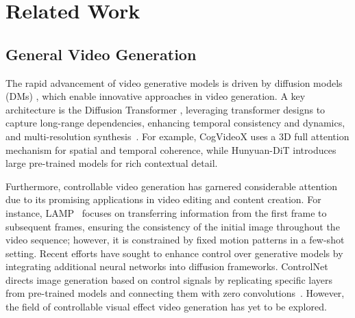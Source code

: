 \section{Related Work}
\subsection{General Video Generation}
The rapid advancement of video generative models is driven by diffusion models (DMs) \cite{sohl2015deep, rombach2022highresolutionimagesynthesislatent, ho2020denoising, song2020score, nichol2021glide}, which enable innovative approaches in video generation.
A key architecture is the Diffusion Transformer \cite{peebles2023scalable}, leveraging transformer designs to capture long-range dependencies, enhancing temporal consistency and dynamics, and multi-resolution synthesis~\cite{yang2024cogvideox, ma2024latte, shao2024human4dit, videoworldsimulators2024, chen2023videocrafter1, kuaishou2024keling, genmo2024mochi}.
For example, CogVideoX \cite{yang2024cogvideox} uses a 3D full attention mechanism for spatial and temporal coherence, while Hunyuan-DiT \cite{li2024hunyuanditpowerfulmultiresolutiondiffusion} introduces large pre-trained models for rich contextual detail. 



Furthermore, controllable video generation has garnered considerable attention due to its promising applications in video editing and content creation. 
For instance, LAMP~\cite{wu2023lamp} focuses on transferring information from the first frame to subsequent frames, ensuring the consistency of the initial image throughout the video sequence; however, it is constrained by fixed motion patterns in a few-shot setting. 
Recent efforts have sought to enhance control over generative models by integrating additional neural networks into diffusion frameworks. 
ControlNet~\cite{zhang2023adding} directs image generation based on control signals by replicating specific layers from pre-trained models and connecting them with zero convolutions~\cite{wang2024disco}. However, the field of controllable visual effect video generation has yet to be explored.
